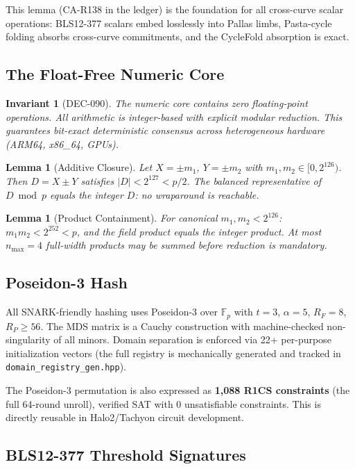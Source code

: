 \documentclass[11pt, a4paper]{article}
\newtheorem{lemma}[theorem]{Lemma}
\newtheorem{invariant}{Invariant}
\begin{document}
This lemma (CA-R138 in the ledger) is the foundation for all cross-curve scalar operations: BLS12-377 scalars embed losslessly into Pallas limbs, Pasta-cycle folding absorbs cross-curve commitments, and the CycleFold absorption is exact.

\subsection{The Float-Free Numeric Core}

\begin{invariant}[DEC-090]
The numeric core contains zero floating-point operations. All arithmetic is integer-based with explicit modular reduction. This guarantees bit-exact deterministic consensus across heterogeneous hardware (ARM64, x86\_64, GPUs).
\end{invariant}

\begin{lemma}[Additive Closure]
Let $X = \pm m_1$, $Y = \pm m_2$ with $m_1, m_2 \in [0, 2^{126})$. Then $D = X \pm Y$ satisfies $|D| < 2^{127} < p/2$. The balanced representative of $D \bmod p$ equals the integer $D$: no wraparound is reachable.
\end{lemma}

\begin{lemma}[Product Containment]
For canonical $m_1, m_2 < 2^{126}$: $m_1 m_2 < 2^{252} < p$, and the field product equals the integer product. At most $n_{\max} = 4$ full-width products may be summed before reduction is mandatory.
\end{lemma}

\subsection{Poseidon-3 Hash}

All SNARK-friendly hashing uses Poseidon-3 over $\mathbb{F}_p$ with $t = 3$, $\alpha = 5$, $R_F = 8$, $R_P \ge 56$. The MDS matrix is a Cauchy construction with machine-checked non-singularity of all minors. Domain separation is enforced via 22+ per-purpose initialization vectors (the full registry is mechanically generated and tracked in \texttt{domain\_registry\_gen.hpp}).

The Poseidon-3 permutation is also expressed as \textbf{1,088 R1CS constraints} (the full 64-round unroll), verified SAT with 0 unsatisfiable constraints. This is directly reusable in Halo2/Tachyon circuit development.

\subsection{BLS12-377 Threshold Signatures}
\end{document}

